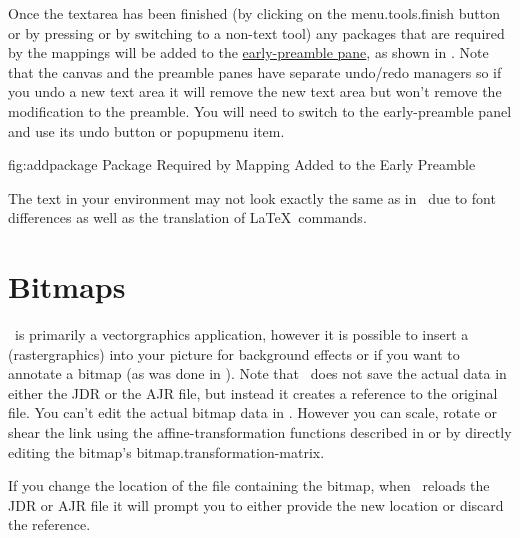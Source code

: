 Once the \gls{textarea} has been finished (by clicking on the
\gls{menu.tools.finish} button or by pressing
 or by switching to a non-text
tool) any packages that are required by the mappings will be added
to the \hyperref[sec:preamble]{early-preamble pane}, as shown in
.  Note that the \gls{canvas} and the
preamble panes have separate undo\slash redo managers so if you undo
a new text area it will remove the new text area but won't remove
the modification to the preamble. You will need to switch to the
early-preamble panel and use its undo button or \gls{popupmenu} item.

\FloatFig
  {fig:addpackage}
  {}
  {Package Required by Mapping Added to the Early Preamble}

\begin{important}
The text in your  environment may not
look exactly the same as in \FlowframTk\ due to font differences as
well as the translation of \LaTeX\ commands.
\end{important}


\section{Bitmaps}\label{sec:insertbitmap}


\FlowframTk\ is primarily a \gls{vectorgraphics} application,
however it is possible to insert a 
(\gls{rastergraphics}) into your picture for background effects or
if you want to annotate a \gls{bitmap} (as was done in
).  Note that
\FlowframTk\ does not save the actual  data in either
the \gls{JDR} or the \gls{AJR} file, but instead it creates a reference
to the original file. You can't edit the actual bitmap data in
\FlowframTk. However you can scale, rotate or shear the link
using the \gls{affine-transformation} functions described in 
 or by directly editing the
bitmap's \gls{bitmap.transformation-matrix}. 

\begin{important}
If you change the location of the file containing the bitmap, when
\FlowframTk\ reloads the \gls*{JDR} or \gls*{AJR} file it will
prompt you to either provide the new location or discard the reference.
\end{important}

